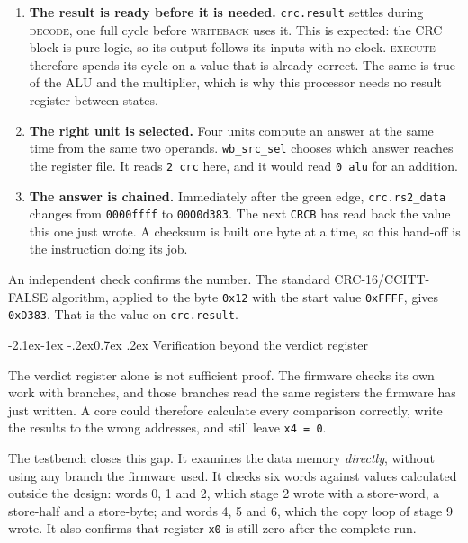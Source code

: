 \documentclass[11pt,a4paper]{article}
\makeatletter
\renewcommand\subsection{\@startsection{subsection}{2}{\z@}%
  {-2.1ex\@plus -1ex \@minus -.2ex}{0.7ex \@plus .2ex}%
  {\color{rvbldark}\normalfont\normalsize\bfseries}}
\makeatother
\begin{document}
\begin{enumerate}[leftmargin=1.35em,itemsep=1pt,topsep=2pt]
\item \textbf{The result is ready before it is needed.} \texttt{crc.result} settles during
  \textsc{decode}, one full cycle before \textsc{writeback} uses it. This is expected: the
  CRC block is pure logic, so its output follows its inputs with no clock. \textsc{execute}
  therefore spends its cycle on a value that is already correct. The same is true of the ALU
  and the multiplier, which is why this processor needs no result register between states.
\item \textbf{The right unit is selected.} Four units compute an answer at the same time from
  the same two operands. \texttt{wb\_src\_sel} chooses which answer reaches the register
  file. It reads \texttt{2 crc} here, and it would read \texttt{0 alu} for an addition.
\item \textbf{The answer is chained.} Immediately after the green edge,
  \texttt{crc.rs2\_data} changes from \texttt{0000ffff} to \texttt{0000d383}. The next
  \texttt{CRCB} has read back the value this one just wrote. A checksum is built one byte at
  a time, so this hand-off is the instruction doing its job.
\end{enumerate}

An independent check confirms the number. The standard CRC-16/CCITT-FALSE algorithm, applied
to the byte \texttt{0x12} with the start value \texttt{0xFFFF}, gives \texttt{0xD383}. That
is the value on \texttt{crc.result}.

\subsection{Verification beyond the verdict register}

The verdict register alone is not sufficient proof. The firmware checks its own work with
branches, and those branches read the same registers the firmware has just written. A core
could therefore calculate every comparison correctly, write the results to the wrong
addresses, and still leave \texttt{x4 = 0}.

The testbench closes this gap. It examines the data memory \emph{directly}, without using
any branch the firmware used. It checks six words against values calculated outside the
design: words 0, 1 and 2, which stage 2 wrote with a store-word, a store-half and a
store-byte; and words 4, 5 and 6, which the copy loop of stage 9 wrote. It also confirms
that register \texttt{x0} is still zero after the complete run.
\end{document}
